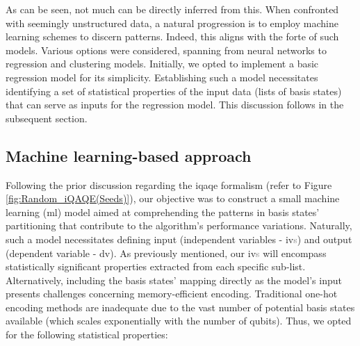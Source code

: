 As can be seen, not much can be directly inferred from this. When confronted with seemingly unstructured data, a natural progression is to employ machine learning schemes to discern patterns. Indeed, this aligns with the forte of such models. Various options were considered, spanning from neural networks to regression and clustering models. Initially, we opted to implement a basic regression model for its simplicity. Establishing such a model necessitates identifying a set of statistical properties of the input data (lists of basis states) that can serve as inputs for the regression model. This discussion follows in the subsequent section.

\vspace{-2.5mm}
\subsection*{Machine learning-based approach}
Following the prior discussion regarding the \acrshort{iqaqe} formalism (refer to Figure \ref{fig:Random_iQAQE(Seeds)}), our objective was to construct a small machine learning (\acrshort{ml}) model aimed at comprehending the patterns in basis states' partitioning that contribute to the algorithm's performance variations. Naturally, such a model necessitates defining input (independent variables - \acrshort{iv}\textcolor{gray}{s}) and output (dependent variable - \acrshort{dv}). As previously mentioned, our \acrshort{iv}\textcolor{gray}{s} will encompass statistically significant properties extracted from each specific sub-list. Alternatively, including the basis states' mapping directly as the model's input presents challenges concerning memory-efficient encoding. Traditional one-hot encoding methods are inadequate due to the vast number of potential basis states available (which scales exponentially with the number of qubits). Thus, we opted for the following statistical properties:
